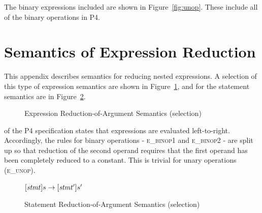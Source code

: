 \documentclass[UTF8]{article}
\begin{document}
The binary expressions included are shown in Figure~\ref{fig:unop}. These include all of the binary operations in P4.

\section{Semantics of Expression Reduction}
\label{app:exp}
This appendix describes semantics for reducing nested expressions. A selection of this type of expression semantics are shown in Figure~\ref{fig:semexp2}, and for the statement semantics are in Figure~\ref{fig:semstmt2}.

\begin{figure}[ht!]
\caption{Expression Reduction-of-Argument Semantics (selection)}
\label{fig:semexp2}
\end{figure}

 of the P4 specification states that expressions are evaluated left-to-right. Accordingly, the rules for binary operations - \textsc{e\_binop1} and \textsc{e\_binop2} - are split up so that reduction of the second operand requires that the first operand has been completely reduced to a constant. This is trivial for unary operations (\textsc{e\_unop}).

\begin{figure}[ht!]
\begin{ottdefnblock}{$[  \mathit{stmt}  ]  s  \rightarrow  [  \mathit{stmt'}  ]  s'$}{}
\ottusedrule{\ottdrulestmtXXretXXe{}}
\ottusedrule{\ottdrulestmtXXassXXe{}}
\ottusedrule{\ottdrulestmtXXcondXXe{}}
\end{ottdefnblock}
\caption{Statement Reduction-of-Argument Semantics (selection)}
\label{fig:semstmt2}
\end{figure}

\printbibliography
\end{document}

